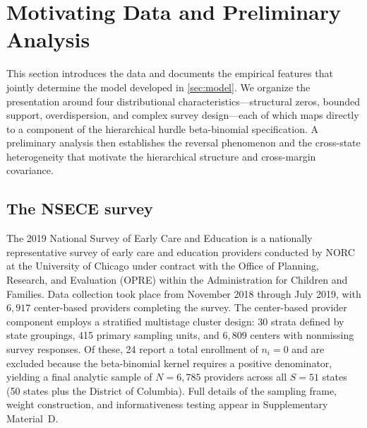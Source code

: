 
\section{Motivating Data and Preliminary Analysis}
\label{sec:data}

This section introduces the data and documents the empirical features
that jointly determine the model developed in \cref{sec:model}.  We
organize the presentation around four distributional
characteristics---structural zeros, bounded support, overdispersion, and
complex survey design---each of which maps directly to a component of the
hierarchical hurdle beta-binomial specification.  A preliminary analysis
then establishes the reversal phenomenon and the cross-state
heterogeneity that motivate the hierarchical structure and cross-margin
covariance.


\subsection{The NSECE survey}\label{sec:nsece}

The 2019 National Survey of Early Care and Education
\citep[NSECE;][]{NSECEProjectTeam2022} is a nationally representative
survey of early care and education providers conducted by NORC at the
University of Chicago under contract with the Office of Planning,
Research, and Evaluation (OPRE) within the Administration for Children
and Families.  Data collection took place from November 2018 through
July 2019, with $6{,}917$ center-based providers completing the survey.
The center-based provider component employs a stratified
multistage cluster design: 30 strata defined by state groupings, 415
primary sampling units, and $6{,}809$ centers with nonmissing survey
responses.
Of these, 24 report a total enrollment of $n_i = 0$ and are excluded
because the beta-binomial kernel requires a positive denominator,
yielding a final analytic sample of $N = 6{,}785$ providers across all
$S = 51$ states (50 states plus the District of Columbia).  Full details of the sampling frame, weight
construction, and informativeness testing appear in Supplementary
Material~D.

